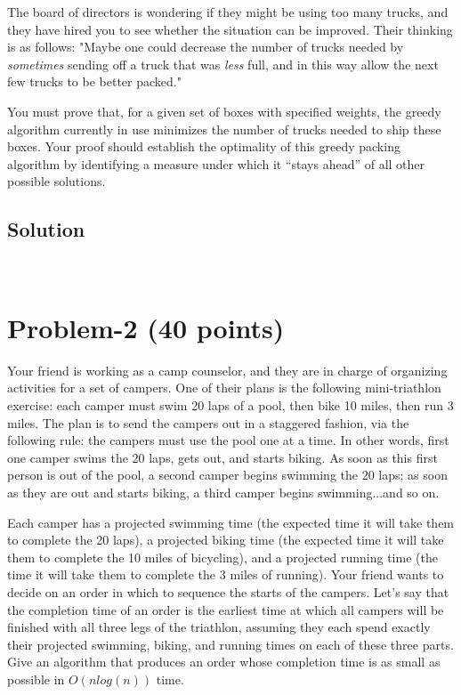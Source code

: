\documentclass[11pt]{article}
\begin{document}
The board of directors is wondering if they might be using too many trucks, and they have hired you to see whether the situation can be improved. Their thinking is as follows: "Maybe one could decrease the number of trucks needed by {\it sometimes} sending off a truck that was {\it less} full, and in this way allow the next few trucks to be better packed."

You must prove that, for a given set of boxes with specified weights, the greedy algorithm currently in use minimizes the number of trucks needed to ship these boxes. Your proof should establish the optimality of this greedy packing algorithm by identifying a measure under which it “stays ahead” of all other possible solutions.


\subsection*{Solution}





​
\newpage
\section*{Problem-2 (40 points)}
\noindent
Your friend is working as a camp counselor, and they are in charge of organizing activities for a set of campers. One of their plans is the following mini-triathlon exercise: each camper must swim 20 laps of a pool, then bike 10 miles, then run 3 miles. The plan is to send the campers out in a staggered fashion, via the following rule: the campers must use the pool one at a time. In other words, first one camper swims the 20 laps, gets out, and starts biking. As soon as this first person is out of the pool, a second camper begins swimming the 20 laps; as soon as they are out and starts biking, a third camper begins swimming...and so on.

Each camper has a projected swimming time (the expected time it will take them to complete the 20 laps), a projected biking time (the expected time it will take them to complete the 10 miles of bicycling), and a projected running time (the time it will take them to complete the 3 miles of running). Your friend wants to decide on an order in which to sequence the starts of the campers. Let’s say that the completion time of an order is the earliest time at which all campers will be finished with all three legs of the triathlon, assuming they each spend exactly their projected swimming, biking, and running times on each of these three parts. Give an algorithm that produces an order whose completion time is as small as possible in $O(nlog(n))$ time.
\end{document}

